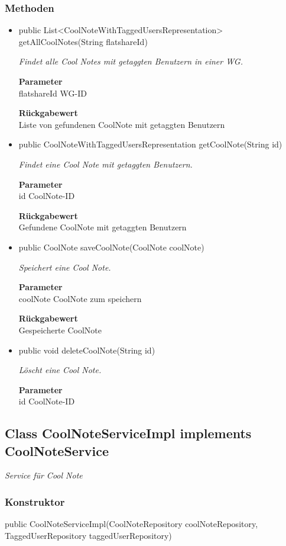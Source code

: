 \documentclass[a4paper]{scrreprt}
\begin{document}
    \subsubsection{Methoden}
    \begin{itemize}
    	\item{public List<CoolNoteWithTaggedUsersRepresentation> getAllCoolNotes(String flatshareId)}
    	
    	\textit{Findet alle Cool Notes mit getaggten Benutzern in einer WG.}
    	
    	\textbf{Parameter} \\
    	flatshareId WG-ID
    	
    	\textbf{Rückgabewert} \\
    	Liste von gefundenen CoolNote mit getaggten Benutzern        \item{public CoolNoteWithTaggedUsersRepresentation getCoolNote(String id)}
    	
    	\textit{Findet eine Cool Note mit getaggten Benutzern.}
    	
    	\textbf{Parameter} \\
    	id CoolNote-ID
    	
    	\textbf{Rückgabewert} \\
    	Gefundene CoolNote mit getaggten Benutzern        \item{public CoolNote saveCoolNote(CoolNote coolNote)}
    	
    	\textit{Speichert eine Cool Note.}
    	
    	\textbf{Parameter} \\
    	coolNote CoolNote zum speichern
    	
    	\textbf{Rückgabewert} \\
    	Gespeicherte CoolNote        \item{public void deleteCoolNote(String id)}
    	
    	\textit{Löscht eine Cool Note.}
    	
    	\textbf{Parameter} \\
    	id CoolNote-ID
    	
    	
    \end{itemize}
    \subsection{Class CoolNoteServiceImpl implements CoolNoteService}
    \textit{Service für Cool Note}
    \subsubsection{Konstruktor}
    public CoolNoteServiceImpl(CoolNoteRepository coolNoteRepository, TaggedUserRepository taggedUserRepository)
\end{document}
